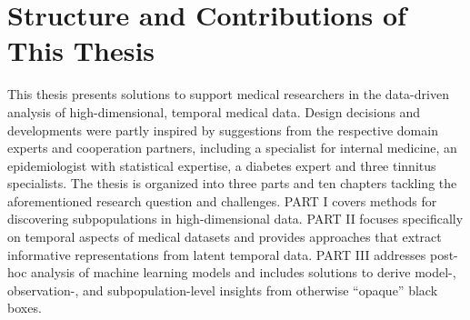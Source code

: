 \documentclass[
  oneside]{book}
\begin{document}
\hypertarget{structure-and-contributions-of-this-thesis}{%
\section{Structure and Contributions of This Thesis}\label{structure-and-contributions-of-this-thesis}}

This thesis presents solutions to support medical researchers in the data-driven analysis of high-dimensional, temporal medical data.
Design decisions and developments were partly inspired by suggestions from the respective domain experts and cooperation partners, including a specialist for internal medicine, an epidemiologist with statistical expertise, a diabetes expert and three tinnitus specialists.
The thesis is organized into three parts and ten chapters tackling the aforementioned research question and challenges.
PART I covers methods for discovering subpopulations in high-dimensional data.
PART II focuses specifically on temporal aspects of medical datasets and provides approaches that extract informative representations from latent temporal data.
PART III addresses post-hoc analysis of machine learning models and includes solutions to derive model-, observation-, and subpopulation-level insights from otherwise ``opaque'' black boxes.
\end{document}
